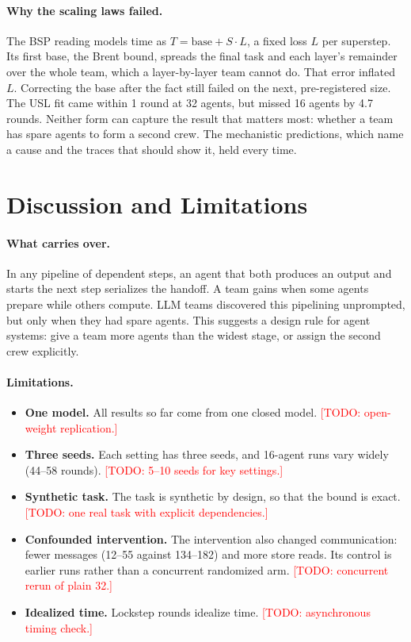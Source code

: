 \documentclass[10pt,twocolumn]{article}
\newcommand{\todo}[1]{\textcolor{red}{[TODO: #1]}}
\begin{document}
\paragraph{Why the scaling laws failed.}
The BSP reading models time as $T = \text{base} + S\cdot L$, a fixed loss $L$ per superstep.
Its first base, the Brent bound, spreads the final task and each layer's remainder over the whole team, which a layer-by-layer team cannot do. That error inflated $L$.
Correcting the base after the fact still failed on the next, pre-registered size.
The USL fit came within 1 round at 32 agents, but missed 16 agents by 4.7 rounds.
Neither form can capture the result that matters most: whether a team has spare agents to form a second crew.
The mechanistic predictions, which name a cause and the traces that should show it, held every time.

\section{Discussion and Limitations}

\paragraph{What carries over.}
In any pipeline of dependent steps, an agent that both produces an output and starts the next step serializes the handoff. A team gains when some agents prepare while others compute.
LLM teams discovered this pipelining unprompted, but only when they had spare agents.
This suggests a design rule for agent systems: give a team more agents than the widest stage, or assign the second crew explicitly.

\paragraph{Limitations.}
\begin{itemize}\setlength\itemsep{1pt}
\item \textbf{One model.} All results so far come from one closed model. \todo{open-weight replication.}
\item \textbf{Three seeds.} Each setting has three seeds, and 16-agent runs vary widely (44--58 rounds). \todo{5--10 seeds for key settings.}
\item \textbf{Synthetic task.} The task is synthetic by design, so that the bound is exact. \todo{one real task with explicit dependencies.}
\item \textbf{Confounded intervention.} The intervention also changed communication: fewer messages (12--55 against 134--182) and more store reads. Its control is earlier runs rather than a concurrent randomized arm. \todo{concurrent rerun of plain 32.}
\item \textbf{Idealized time.} Lockstep rounds idealize time. \todo{asynchronous timing check.}
\end{itemize}
\end{document}

